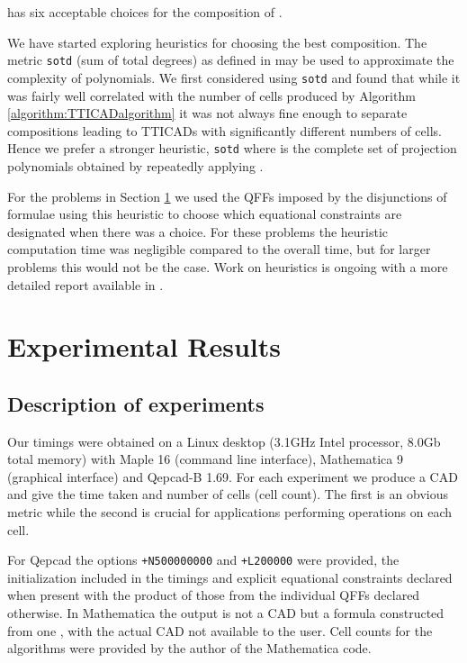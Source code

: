 \documentclass{article}
\begin{document}
has six acceptable choices for the composition of .

We have started exploring heuristics for choosing the best composition. The metric  {\tt sotd} (sum of total degrees) as defined in \cite{Dolzmannetal2004a} may be used to approximate the complexity of polynomials. 
We first considered using \texttt{sotd} and found that while it was fairly well correlated with the number of cells produced by Algorithm \ref{algorithm:TTICADalgorithm} it was not always fine enough to separate compositions leading to TTICADs with significantly different numbers of cells.  Hence we prefer a stronger heuristic, \texttt{sotd} where  is the complete set of projection polynomials obtained by repeatedly applying .  

For the problems in Section \ref{sec:Experiment} we used the QFFs imposed by the disjunctions of formulae using this heuristic to choose which equational constraints are designated when there was a choice. For these problems the heuristic computation time was negligible compared to the overall time, but for larger problems this would not be the case.  Work on heuristics is ongoing with a more detailed report available in \cite{BDEW13}. 







\section{Experimental Results}
\label{sec:Experiment}

\subsection{Description of experiments}

Our timings were obtained on a Linux desktop (3.1GHz Intel processor, 8.0Gb total memory) with {\sc Maple} 16 (command line interface), {\sc Mathematica} 9 (graphical interface) and {\sc Qepcad-B} 1.69.  
For each experiment we produce a CAD and give the time taken and number of cells (cell count). The first is an obvious metric while the second is crucial for applications performing operations on each cell.  

For {\sc Qepcad} the options {\tt +N500000000} and {\tt +L200000} were provided, the initialization included in the timings and explicit equational constraints declared when present with the product of those from the individual QFFs declared otherwise.  
In {\sc Mathematica} the output is not a CAD but a formula constructed from one \cite{Strzebonski10}, with the actual CAD not available to the user.  Cell counts for the algorithms were provided by the author of the {\sc Mathematica} code. 
\end{document}
